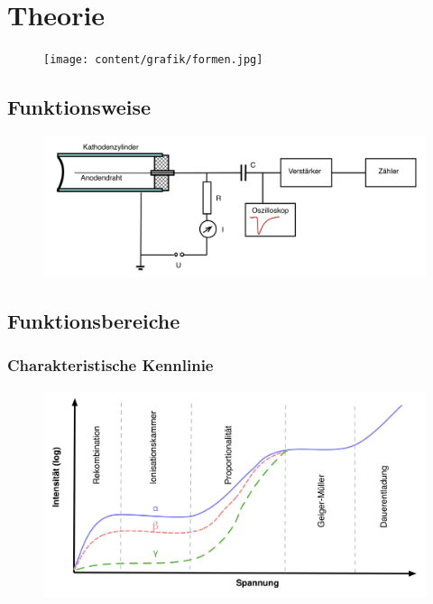 \section{Theorie}
\label{sec:theorie}

\begin{figure}[H]
	\centering
	\texttt{[image: content/grafik/formen.jpg]}
	\caption{}
	\label{fig:formen}
\end{figure}

\subsection{Funktionsweise}

\begin{figure}[H]
	\centering
	\includegraphics[width=0.9\linewidth]{content/grafik/diagramm.jpg}
	\caption{}
	\label{fig:diagramm}
\end{figure}

\subsection{Funktionsbereiche}

\subsubsection{Charakteristische Kennlinie}

\begin{figure}[H]
	\centering
	\includegraphics[width=0.9\linewidth]{content/grafik/kurve.jpg}
	\caption{}
	\label{fig:kurve}
\end{figure}

